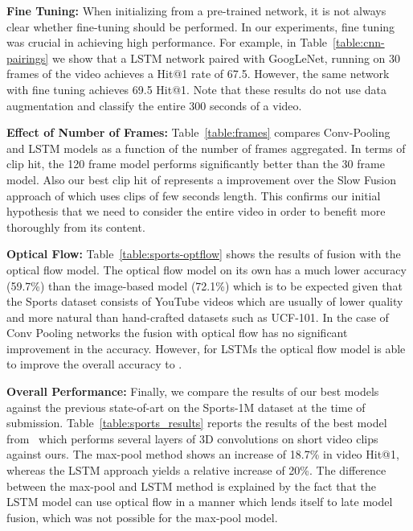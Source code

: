 \documentclass[10pt,twocolumn,letterpaper]{article}
\begin{document}
\textbf{Fine Tuning:} When initializing from a pre-trained network, it is not
always clear whether fine-tuning should be performed. In our experiments, fine
tuning was crucial in achieving high performance. For example, in
Table~\ref{table:cnn-pairings} we show that a LSTM network paired with
GoogLeNet, running on 30 frames of the video achieves a Hit@1 rate of 67.5. However,
the same network with fine tuning achieves 69.5 Hit@1. Note that these results do not use
data augmentation and classify the entire 300 seconds of a video.

\textbf{Effect of Number of Frames:}
Table~\ref{table:frames} compares Conv-Pooling and LSTM models as a function of the number of frames aggregated. In terms of clip hit, the 120 frame model
 performs significantly better than the 30 frame model.
Also our best clip hit of  represents a  improvement over the Slow Fusion approach of \cite{karpathy2014large} which uses
clips of few seconds length. This confirms our initial hypothesis that we need to consider the entire video in order to benefit
more thoroughly from its content.


\textbf{Optical Flow:}
Table~\ref{table:sports-optflow} shows the results of fusion with the optical
flow model. The optical flow model on its own has a much lower accuracy
(59.7\%) than the image-based model (72.1\%) which is to be expected given that
the Sports dataset consists of YouTube videos which are usually of lower
quality and more natural than hand-crafted datasets such as UCF-101. In the
case of Conv Pooling networks the fusion with optical flow has no significant
improvement in the accuracy.  However, for LSTMs the optical flow model is able
to improve the overall accuracy to .

\textbf{Overall Performance:}
Finally, we compare the results of our best models against the previous
state-of-art on the Sports-1M dataset at the time of submission.
Table~\ref{table:sports_results} reports the results of the best model
from~\cite{karpathy2014large} which performs several layers of 3D convolutions
on short video clips against ours.  The max-pool method shows an increase of
18.7\% in video Hit@1, whereas the LSTM approach yields a relative increase of 20\%.
The difference between the max-pool and LSTM method is explained by the fact
that the LSTM model can use optical flow in a manner which lends itself to late
model fusion, which was not possible for the max-pool model.
\end{document}

